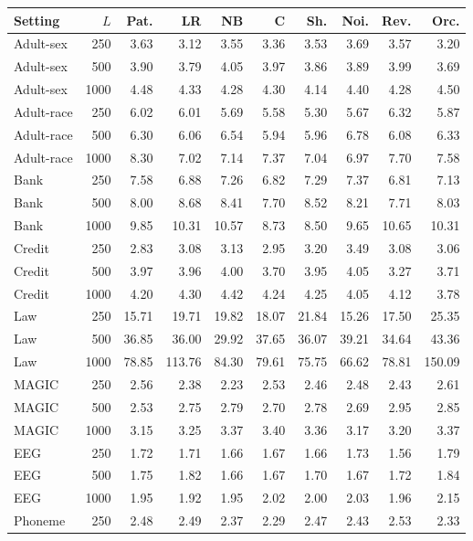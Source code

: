 \begin{tabular}{lrrrrrrrrr}
\toprule
Setting & $L$ & Pat. & LR & NB & C & Sh. & Noi. & Rev. & Orc. \\
\midrule
Adult-sex & 250 & 3.63 & 3.12 & 3.55 & 3.36 & 3.53 & 3.69 & 3.57 & 3.20 \\
Adult-sex & 500 & 3.90 & 3.79 & 4.05 & 3.97 & 3.86 & 3.89 & 3.99 & 3.69 \\
Adult-sex & 1000 & 4.48 & 4.33 & 4.28 & 4.30 & 4.14 & 4.40 & 4.28 & 4.50 \\
Adult-race & 250 & 6.02 & 6.01 & 5.69 & 5.58 & 5.30 & 5.67 & 6.32 & 5.87 \\
Adult-race & 500 & 6.30 & 6.06 & 6.54 & 5.94 & 5.96 & 6.78 & 6.08 & 6.33 \\
Adult-race & 1000 & 8.30 & 7.02 & 7.14 & 7.37 & 7.04 & 6.97 & 7.70 & 7.58 \\
Bank & 250 & 7.58 & 6.88 & 7.26 & 6.82 & 7.29 & 7.37 & 6.81 & 7.13 \\
Bank & 500 & 8.00 & 8.68 & 8.41 & 7.70 & 8.52 & 8.21 & 7.71 & 8.03 \\
Bank & 1000 & 9.85 & 10.31 & 10.57 & 8.73 & 8.50 & 9.65 & 10.65 & 10.31 \\
Credit & 250 & 2.83 & 3.08 & 3.13 & 2.95 & 3.20 & 3.49 & 3.08 & 3.06 \\
Credit & 500 & 3.97 & 3.96 & 4.00 & 3.70 & 3.95 & 4.05 & 3.27 & 3.71 \\
Credit & 1000 & 4.20 & 4.30 & 4.42 & 4.24 & 4.25 & 4.05 & 4.12 & 3.78 \\
Law & 250 & 15.71 & 19.71 & 19.82 & 18.07 & 21.84 & 15.26 & 17.50 & 25.35 \\
Law & 500 & 36.85 & 36.00 & 29.92 & 37.65 & 36.07 & 39.21 & 34.64 & 43.36 \\
Law & 1000 & 78.85 & 113.76 & 84.30 & 79.61 & 75.75 & 66.62 & 78.81 & 150.09 \\
MAGIC & 250 & 2.56 & 2.38 & 2.23 & 2.53 & 2.46 & 2.48 & 2.43 & 2.61 \\
MAGIC & 500 & 2.53 & 2.75 & 2.79 & 2.70 & 2.78 & 2.69 & 2.95 & 2.85 \\
MAGIC & 1000 & 3.15 & 3.25 & 3.37 & 3.40 & 3.36 & 3.17 & 3.20 & 3.37 \\
EEG & 250 & 1.72 & 1.71 & 1.66 & 1.67 & 1.66 & 1.73 & 1.56 & 1.79 \\
EEG & 500 & 1.75 & 1.82 & 1.66 & 1.67 & 1.70 & 1.67 & 1.72 & 1.84 \\
EEG & 1000 & 1.95 & 1.92 & 1.95 & 2.02 & 2.00 & 2.03 & 1.96 & 2.15 \\
Phoneme & 250 & 2.48 & 2.49 & 2.37 & 2.29 & 2.47 & 2.43 & 2.53 & 2.33 \\

\end{tabular}
